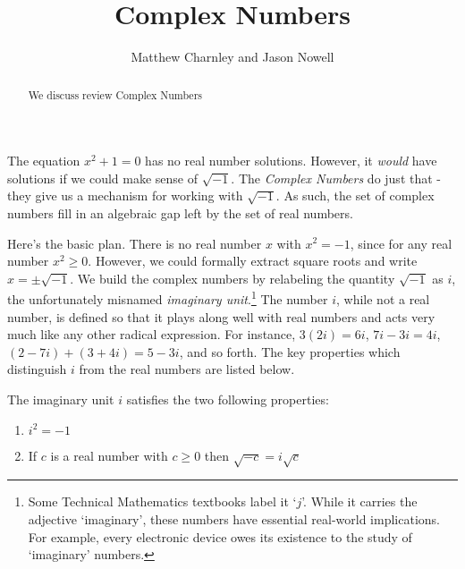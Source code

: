 \documentclass{ximera}
\title{Complex Numbers}
\author{Matthew Charnley and Jason Nowell}
\begin{document}
\begin{abstract}
    We discuss review Complex Numbers
\end{abstract}
\maketitle

\label{sec:complexNums}


The equation $x^{2} + 1 = 0$ has no real number solutions. However, it \emph{would} have solutions if we could make sense of $\sqrt{-1}$. The \emph{Complex Numbers} do just that - they give us a mechanism for working with $\sqrt{-1}$.  As such, the set of complex numbers fill in an algebraic gap left by the set of real numbers.  

\smallskip

Here's the basic plan.  There is no real number $x$ with $x^2 = -1$, since for any real number $x^2 \geq 0$.  However, we could formally extract square roots and write $x = \pm \sqrt{-1}$.  We build the complex numbers by relabeling the quantity $\sqrt{-1}$ as $i$, the unfortunately misnamed \emph{imaginary unit}.\footnote{Some Technical Mathematics textbooks label it `$j$'.  While it carries the adjective `imaginary', these numbers have essential real-world implications.  For example, every electronic device owes its existence to the study of `imaginary' numbers.}  The number $i$, while not a real number, is defined so that it plays along well with real numbers and acts very much like any other radical expression.  For instance, $3(2i) = 6i$, $7i-3i = 4i$, $(2-7i) + (3 + 4i) = 5-3i$, and so forth.  The key properties which distinguish $i$ from the real numbers are listed below.

\begin{definition}
    \label{idefn}
    
    The imaginary unit $i$ satisfies the two following properties:
    \begin{enumerate}
        \item  $i^2 = -1$
        \item  If $c$ is a real number with $c \geq 0$ then $\sqrt{-c} = i \sqrt{c}$
    \end{enumerate}
\end{definition}
\end{document}
